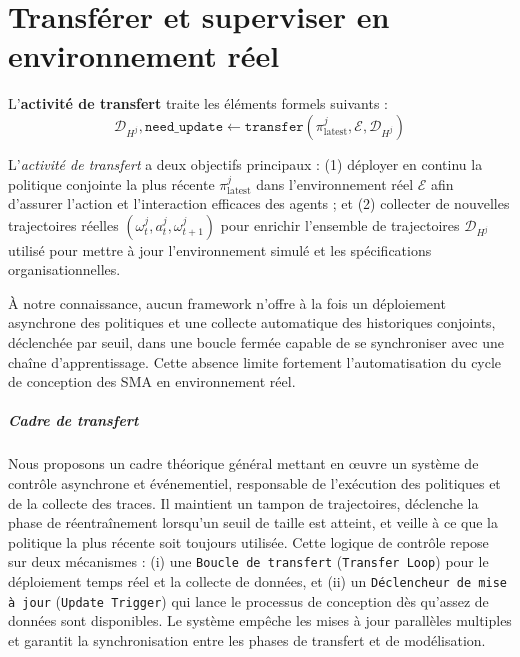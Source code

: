 \chapter{Transférer et superviser en environnement réel}
\label{chap:transferring}

\noindent L'\textbf{activité de transfert} traite les éléments formels suivants :
\[
    \mathcal{D}_{H^j}, \texttt{need\_update} \gets \texttt{transfer}(\pi^j_{\text{latest}}, \mathcal{E}, \mathcal{D}_{H^j})
\]

L'\textit{activité de transfert} a deux objectifs principaux : (1) déployer en continu la politique conjointe la plus récente $\pi^j_{\text{latest}}$ dans l'environnement réel $\mathcal{E}$ afin d'assurer l'action et l'interaction efficaces des agents ; et (2) collecter de nouvelles trajectoires réelles $(\omega^j_t, a^j_t, \omega^j_{t+1})$ pour enrichir l'ensemble de trajectoires $\mathcal{D}_{H^j}$ utilisé pour mettre à jour l'environnement simulé et les spécifications organisationnelles.

À notre connaissance, aucun framework n'offre à la fois un déploiement asynchrone des politiques et une collecte automatique des historiques conjoints, déclenchée par seuil, dans une boucle fermée capable de se synchroniser avec une chaîne d'apprentissage. Cette absence limite fortement l'automatisation du cycle de conception des \ac{SMA} en environnement réel.

\paragraph{Cadre de transfert}

Nous proposons un cadre théorique général mettant en œuvre un système de contrôle asynchrone et événementiel, responsable de l'exécution des politiques et de la collecte des traces. Il maintient un tampon de trajectoires, déclenche la phase de réentraînement lorsqu'un seuil de taille est atteint, et veille à ce que la politique la plus récente soit toujours utilisée. Cette logique de contrôle repose sur deux mécanismes :
(i) une \texttt{Boucle de transfert} (\texttt{Transfer Loop}) pour le déploiement temps réel et la collecte de données, et
(ii) un \texttt{Déclencheur de mise à jour} (\texttt{Update Trigger}) qui lance le processus de conception dès qu'assez de données sont disponibles. Le système empêche les mises à jour parallèles multiples et garantit la synchronisation entre les phases de transfert et de modélisation.

